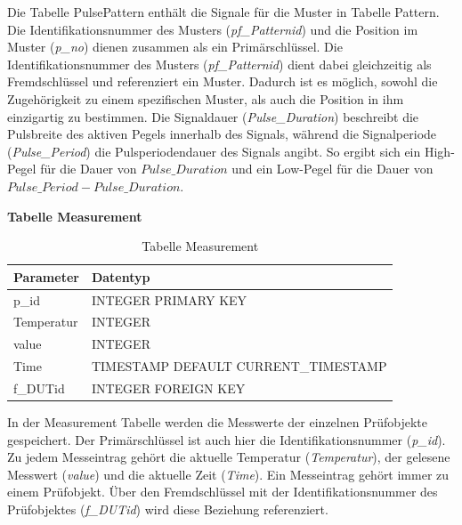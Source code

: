 Die Tabelle PulsePattern enthält die Signale für die Muster in Tabelle Pattern. Die Identifikationsnummer des Musters (\textit{pf\_Patternid}) und die Position im Muster (\textit{p\_no}) dienen zusammen als ein Primärschlüssel. Die Identifikationsnummer des Musters (\textit{pf\_Patternid}) dient dabei gleichzeitig als Fremdschlüssel und referenziert ein Muster. Dadurch ist es möglich, sowohl die Zugehörigkeit zu einem spezifischen Muster, als auch die Position in ihm einzigartig zu bestimmen. Die Signaldauer (\textit{Pulse\_Duration}) beschreibt die Pulsbreite des aktiven Pegels innerhalb des Signals, während die Signalperiode (\textit{Pulse\_Period}) die Pulsperiodendauer des Signals angibt. So ergibt sich ein High-Pegel für die Dauer von $Pulse\_Duration$ und ein Low-Pegel für die Dauer von $Pulse\_Period - Pulse\_Duration$.\\

\newpage

\textbf{Tabelle Measurement}\\

\begin{table}[H]
\begin{center}
\begin{tabular}{|l|l|}\hline
Parameter & Datentyp \\ \hline
p\_id & INTEGER PRIMARY KEY \\ 
Temperatur & INTEGER\\
value & INTEGER\\
Time & TIMESTAMP DEFAULT CURRENT\_TIMESTAMP\\ 
f\_DUTid & INTEGER FOREIGN KEY\\ \hline
\end{tabular}
\caption{Tabelle Measurement}
\label{table_TabelleMeasurement}
\end{center}
\end{table}

In der Measurement Tabelle werden die Messwerte der einzelnen Prüfobjekte gespeichert. Der Primärschlüssel ist auch hier die Identifikationsnummer (\textit{p\_id}). Zu jedem Messeintrag gehört die aktuelle Temperatur (\textit{Temperatur}), der gelesene Messwert (\textit{value}) und die aktuelle Zeit (\textit{Time}). Ein Messeintrag gehört immer zu einem Prüfobjekt. Über den Fremdschlüssel mit der Identifikationsnummer des Prüfobjektes (\textit{f\_DUTid}) wird diese Beziehung referenziert. 




